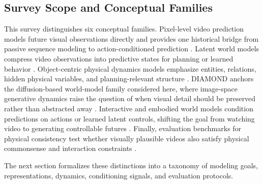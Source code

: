 \subsection{Survey Scope and Conceptual Families}

This survey distinguishes six conceptual families. Pixel-level video prediction models future visual observations directly and provides one historical bridge from passive sequence modeling to action-conditioned prediction \cite{oh2015_action_conditional_video_prediction_prov,finn2016_physical_interaction_video_prediction_prov,babaeizadeh2018_sv2p_prov}. Latent world models compress video observations into predictive states for planning or learned behavior \cite{ha2018_world_models_prov,hafner2019_planet_prov,hafner2020_dreamer_prov}. Object-centric physical dynamics models emphasize entities, relations, hidden physical variables, and planning-relevant structure \cite{battaglia2016_interaction_networks_prov,watters2017_visual_interaction_networks_prov,janner2019_o2p2_prov}. DIAMOND anchors the diffusion-based world-model family considered here, where image-space generative dynamics raise the question of when visual detail should be preserved rather than abstracted away \cite{alonso2024_diamond_prov}. Interactive and embodied world models condition predictions on actions or learned latent controls, shifting the goal from watching video to generating controllable futures \cite{oh2015_action_conditional_video_prediction_prov,finn2016_physical_interaction_video_prediction_prov,bruce2024_genie_prov}. Finally, evaluation benchmarks for physical consistency test whether visually plausible videos also satisfy physical commonsense and interaction constraints \cite{bansal2025_videophy_prov}.

The next section formalizes these distinctions into a taxonomy of modeling goals, representations, dynamics, conditioning signals, and evaluation protocols.
